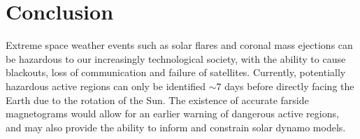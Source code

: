 \documentclass[11pt,a4paper,onecolumn]{report}
\begin{document}











\chapter{Conclusion}
\label{chap:conclusion}
Extreme space weather events such as solar flares and coronal mass ejections can
be hazardous to our increasingly technological society, with the ability to
cause blackouts, loss of communication and failure of satellites. Currently,
potentially hazardous active regions can only be identified \(\sim 7\) days
before directly facing the Earth due to the rotation of the Sun. The existence
of accurate farside magnetograms would allow for an earlier warning of dangerous
active regions, and may also provide the ability to inform and constrain solar
dynamo models. \\ 
\end{document}
